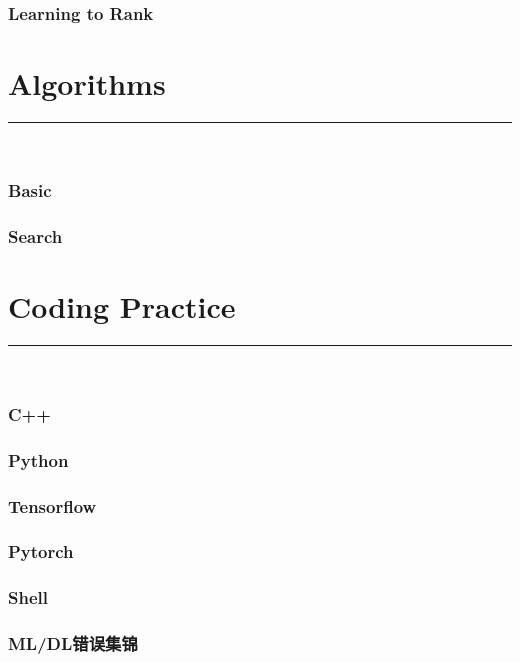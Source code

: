 \documentclass{article}
\begin{document}
\section{Learning to Rank}



\clearpage
\part{Algorithms}
{\noindent}	 \rule[-10pt]{17.5cm}{0.5em}\\
\section{Basic}

\section{Search}



\clearpage
\part{Coding Practice}
{\noindent}	 \rule[-10pt]{17.5cm}{0.5em}\\

\section{C++}


\section{Python}


\section{Tensorflow}


\section{Pytorch}


\section{Shell}


\section{ML/DL错误集锦}

%
\end{document}

